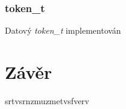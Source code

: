 \documentclass[a4paper, 12pt]{article}
\begin{document}
\subsubsection{token\_t}
Datový \textit{token\_t} implementován

\newpage
{}
\section{Závěr}
srtvsrnzmuzmetvsfverv

\newpage
{}


\end{document}
